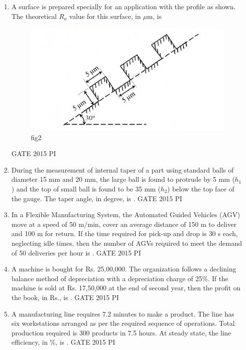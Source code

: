\documentclass[journal,12pt,onecolumn]{IEEEtran}
\theoremstyle{remark}
\begin{document}
\begin{enumerate}
\item A surface is prepared specially for an application with the profile as shown. The theoretical $R_a$ value for this surface, in $\mu$m, is \underline{\hspace{2cm}}
\begin{figure}[H]
    \centering
    \includegraphics[width=0.5\linewidth]{figs/Q.54.png}
    \caption{fig2}
    \label{fig:figs/Q.54.png}
\end{figure}





\hfill{GATE 2015 PI}
\item During the measurement of internal taper of a part using standard balls of diameter 15 mm and 20 mm, the large ball is found to protrude by 5 mm ($h_1$) and the top of small ball is found to be 35 mm ($h_2$) below the top face of the gauge. The taper angle, in degree, is \underline{\hspace{2cm}}. \hfill{GATE 2015 PI}

\item In a Flexible Manufacturing System, the Automated Guided Vehicles (AGV) move at a speed of 50 m/min, cover an average distance of 150 m to deliver and 100 m for return. If the time required for pick-up and drop is 30 s each, neglecting idle times, then the number of AGVs required to meet the demand of 50 deliveries per hour is \underline{\hspace{2cm}}. \hfill{GATE 2015 PI}

\item A machine is bought for Rs. 25,00,000. The organization follows a declining balance method of depreciation with a depreciation charge of 25\%. If the machine is sold at Rs. 17,50,000 at the end of second year, then the profit on the book, in Rs., is \underline{\hspace{2cm}}. \hfill{GATE 2015 PI}

\item A manufacturing line requires 7.2 minutes to make a product. The line has six workstations arranged as per the required sequence of operations. Total production required is 300 products in 7.5 hours. At steady state, the line efficiency, in \%, is \underline{\hspace{2cm}}. \hfill{GATE 2015 PI}


\end{enumerate}
\end{document}
